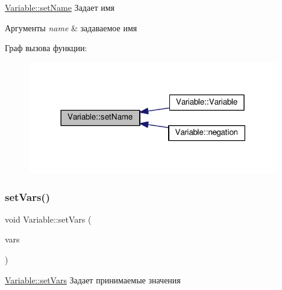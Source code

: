 \hyperlink{class_variable_ab58f8291d67e633fd1ad76148fad9e1a}{Variable\+::set\+Name} Задает имя 


\begin{DoxyParams}{Аргументы}
{\em name} & задаваемое имя \\
\hline
\end{DoxyParams}
Граф вызова функции\+:\nopagebreak
\begin{figure}[H]
\begin{center}
\leavevmode
\includegraphics[width=309pt]{class_variable_ab58f8291d67e633fd1ad76148fad9e1a_icgraph}
\end{center}
\end{figure}
\mbox{\label{class_variable_ae6ac554c0382b43f9a3e37c6382d4471}} 
\subsubsection{\texorpdfstring{set\+Vars()}{setVars()}\hspace{0.1cm}{\footnotesize\ttfamily [1/2]}}
{\footnotesize\ttfamily void Variable\+::set\+Vars (\begin{DoxyParamCaption}\item[{const Q\+List$<$ bool $>$ \&}]{vars }\end{DoxyParamCaption})}



\hyperlink{class_variable_ae6ac554c0382b43f9a3e37c6382d4471}{Variable\+::set\+Vars} Задает принимаемые значения 


